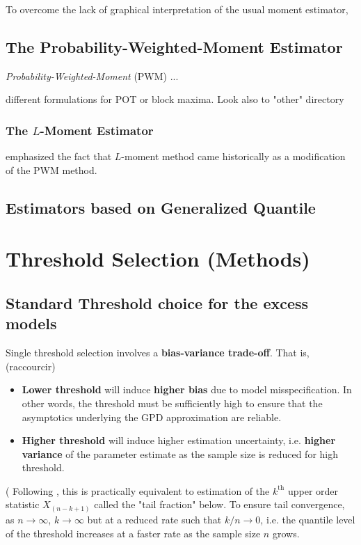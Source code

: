\documentclass[11pt,a4paper,openany ]{book}
\begin{document}
To overcome the lack of graphical interpretation of the usual moment estimator, 




\subsection{The Probability-Weighted-Moment Estimator}

\emph{Probability-Weighted-Moment} (PWM)
...

different formulations for POT or block maxima. Look also to "other" directory
\cite{ribereau_skew_2016}


\subsubsection*{The $L$-Moment Estimator}
\cite{wang_lh_1997}

\cite{hosking_regional_1997} emphasized the fact that $L$-moment method came historically as a modification of the PWM method. 

\subsection{Estimators based on Generalized Quantile }




\section{Threshold Selection (Methods) }\label{stdthr}

\subsection{Standard Threshold choice for the excess models}

Single threshold selection involves a \textbf{bias-variance trade-off}. That is, (raccourcir)

\begin{itemize}
	\item \textbf{Lower threshold} will induce\textbf{ higher bias} due to model misspecification. In other words, the threshold must be sufficiently high to ensure that the asymptotics underlying the GPD approximation are reliable.
	
	\item \textbf{Higher threshold} will induce higher estimation uncertainty, i.e. \textbf{higher variance} of the parameter estimate as the sample size is reduced for high threshold. 
	
\end{itemize}
(
Following \cite{leadbetter_extremes_1983}, this is practically equivalent to estimation of the $k^{\text{th}}$ upper order statistic $X_{(n-k+1)}$
called the "tail fraction" below. To ensure tail convergence, as $n\to\infty$, $k\to\infty$ but at a reduced rate such that $k/n\to 0$, i.e. the quantile level of the threshold increases at a faster rate as the sample size $n$ grows. 
\end{document}
